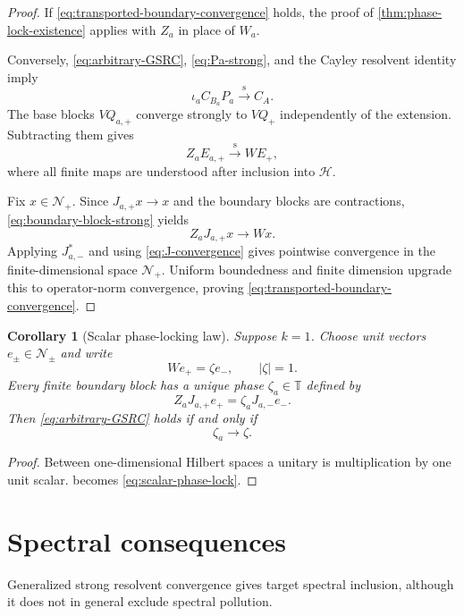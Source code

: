 \documentclass[11pt]{article}
\newtheorem{corollary}[theorem]{Corollary}
\theoremstyle{remark}
\newcommand{\Hh}{\mathcal H}
\begin{document}
\begin{proof}
If \eqref{eq:transported-boundary-convergence} holds, the proof of
\cref{thm:phase-lock-existence} applies with $Z_a$ in place of $W_a$.

Conversely, \eqref{eq:arbitrary-GSRC}, \eqref{eq:Pa-strong}, and the Cayley resolvent identity imply
\[
 \iota_aC_{B_a}P_a\xrightarrow{\mathrm{s}}C_A.
\]
The base blocks $VQ_{a,+}$ converge strongly to $VQ_+$ independently of the extension.  Subtracting
them gives
\begin{equation}\label{eq:boundary-block-strong}
 Z_aE_{a,+}\xrightarrow{\mathrm{s}}WE_+,
\end{equation}
where all finite maps are understood after inclusion into $\Hh$.

Fix $x\in\mathcal N_+$.  Since $J_{a,+}x\to x$ and the boundary blocks are contractions,
\eqref{eq:boundary-block-strong} yields
\[
 Z_aJ_{a,+}x\longrightarrow Wx.
\]
Applying $J_{a,-}^*$ and using \eqref{eq:J-convergence} gives pointwise convergence in the
finite-dimensional space $\mathcal N_+$.  Uniform boundedness and finite dimension upgrade this to
operator-norm convergence, proving \eqref{eq:transported-boundary-convergence}.
\end{proof}

\begin{corollary}[Scalar phase-locking law]\label{cor:scalar-phase}
Suppose $k=1$.  Choose unit vectors $e_\pm\in\mathcal N_\pm$ and write
\[
 We_+=\zeta e_-,\qquad |\zeta|=1.
\]
Every finite boundary block has a unique phase $\zeta_a\in\mathbb T$ defined by
\[
 Z_aJ_{a,+}e_+=\zeta_aJ_{a,-}e_-.
\]
Then \eqref{eq:arbitrary-GSRC} holds if and only if
\begin{equation}\label{eq:scalar-phase-lock}
 \zeta_a\longrightarrow\zeta.
\end{equation}
\end{corollary}

\begin{proof}
Between one-dimensional Hilbert spaces a unitary is multiplication by one unit scalar.
 becomes \eqref{eq:scalar-phase-lock}.
\end{proof}

\section{Spectral consequences}\label{sec:spectral}

Generalized strong resolvent convergence gives target spectral inclusion, although it does not in
general exclude spectral pollution.
\end{document}
